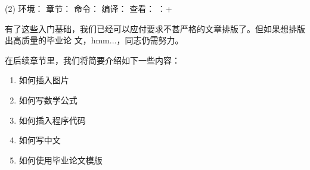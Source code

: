 \begin{tasks}(2)
\task[] 环境：
\task[] 章节：
\task[] 命令：
\task[] 编译：
\task[] 查看：
\task[] \ltx{\item}：\LKeyAlt{}+\LKeyEnter
\end{tasks}

有了这些入门基础，我们已经可以应付要求不甚严格的文章排版了。但如果想排版出高质量的毕业论
文，hmm...，同志仍需努力。

在后续章节里，我们将简要介绍如下一些内容：

\begin{enumerate}
\item 如何插入图片
\item 如何写数学公式
\item 如何插入程序代码
\item 如何写中文
\item 如何使用毕业论文模版
\end{enumerate}

